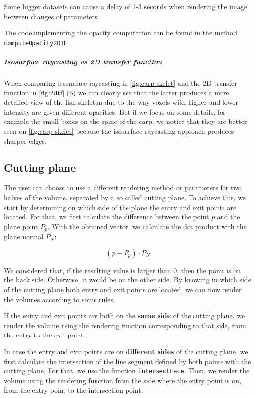 \documentclass[a4paper]{article}
\begin{document}
Some bigger datasets can cause a delay of 1-3 seconds when rendering the image between changes of parameters.

The code implementing the opacity computation can be found in the method {\tt computeOpacity2DTF}.

\subparagraph{Isosurface raycasting vs 2D transfer function}

When comparing isosurface raycasting in \autoref{fig:carp-skelet} and the 2D transfer function in \autoref{fig:2dtf} (b) we can clearly see that the latter produces a more detailed view of the fish skeleton due to the way voxels with higher and lower intensity are given different opacities. But if we focus on some details, for example the small bones on the spine of the carp, we notice that they are better seen on \autoref{fig:carp-skelet} because the isosurface raycasting approach produces sharper edges.

\subsection{Cutting plane}

The user can choose to use a different rendering method or parameters for two halves of the volume, separated by a so called cutting plane. To achieve this, we start by determining on which side of the plane the entry and exit points are located. For that, we first calculate the difference between the point $p$ and the plane point $P_p$. With the obtained vector, we calculate the dot product with the plane normal $P_N$:

$$(p-P_p)\cdot P_N$$

We considered that, if the resulting value is larger than 0, then the point is on the back side. Otherwise, it would be on the other side. By knowing in which side of the cutting plane both entry and exit points are located, we can now render the volumes according to some rules.

If the entry and exit points are both on the \textbf{same side} of the cutting plane, we render the volume using the rendering function corresponding to that side, from the entry to the exit point.

In case the entry and exit points are on \textbf{different sides} of the cutting plane, we first calculate the intersection of the line segment defined by both points with the cutting plane. For that, we use the function {\tt intersectFace}. Then, we render the volume using the rendering function from the side where the entry point is on, from the entry point to the intersection point.
\end{document}
